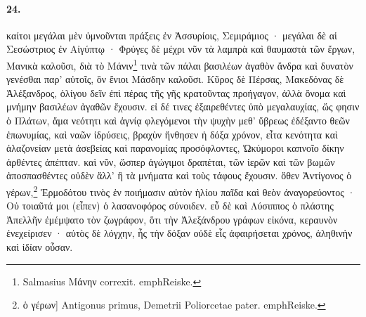 \documentclass[a4paper, 11pt, oneside, polutonikogreek, german]{article}
\begin{document}
\paragraph{24.}
καίτοι μεγάλαι μὲν ὑμνοῦνται πράξεις ἐν Ἀσσυρίοις, Σεμιράμιος · μεγάλαι δὲ αἱ Σεσώστριος ἐν Αἰγύπτῳ · Φρύγες δὲ μέχρι νῦν τὰ λαμπρὰ καὶ θαυμαστὰ τῶν ἔργων, Μανικὰ καλοῦσι, διὰ τὸ Μάνιν\footnote{Salmasius Μάνην correxit. emph{Reiske.}} τινὰ τῶν πάλαι βασιλέων ἀγαθὸν ἄνδρα καὶ δυνατὸν γενέσθαι παρ' αὐτοῖς, ὃν ἔνιοι Μάσδην καλοῦσι. Κῦρος δὲ Πέρσας, Μακεδόνας δὲ Ἀλέξανδρος, ὀλίγου δεῖν ἐπὶ πέρας τῆς γῆς κρατοῦντας προήγαγον, ἀλλὰ ὄνομα καὶ μνήμην βασιλέων ἀγαθῶν ἔχουσιν. εἰ δέ τινες ἐξαιρεθέντες ὑπὸ μεγαλαυχίας, ὥς φησιν ὁ Πλάτων, ἅμα νεότητι καὶ ἁγνίᾳ φλεγόμενοι τὴν ψυχὴν μεθ' ὕβρεως ἐδέξαντο θεῶν ἐπωνυμίας, καὶ ναῶν ἱδρύσεις, βραχὺν ἤνθησεν ἡ δόξα χρόνον, εἶτα κενότητα καὶ ἀλαζονείαν μετὰ ἀσεβείας καὶ παρανομίας προσόφλοντες, Ὠκύμοροι καπνοῖο δίκην ἀρθέντες ἀπέπταν. καὶ νῦν, ὥσπερ ἀγώγιμοι δραπέται, τῶν ἱερῶν καὶ τῶν βωμῶν ἀποσπασθέντες οὐδὲν ἄλλ' ἢ τὰ μνήματα καὶ τοὺς τάφους ἔχουσιν. ὅθεν Ἀντίγονος ὁ γέρων,\footnote{ὁ γέρων] Antigonus primus, Demetrii Poliorcetae pater. emph{Reiske.}} Ἑρμοδότου τινὸς ἐν ποιήμασιν αὐτὸν ἡλίου παῖδα καὶ θεὸν ἀναγορεύοντος · Οὐ τοιαῦτά μοι (εἶπεν) ὁ λασανοφόρος σύνοιδεν. εὖ δὲ καὶ Λύσιππος ὁ πλάστης Ἀπελλῆν ἐμέμψατο τὸν ζωγράφον, ὅτι τὴν Ἀλεξάνδρου γράφων εἰκόνα, κεραυνὸν ἐνεχείρισεν · αὐτὸς δὲ λόγχην, ἧς τὴν δόξαν οὐδὲ εἷς ἀφαιρήσεται χρόνος, ἀληθινὴν καὶ ἰδίαν οὖσαν.
\end{document}
